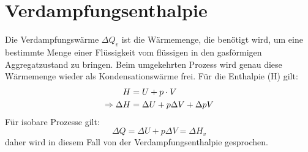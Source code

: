 \documentclass[10pt,a4paper]{article}
\begin{document}
\section{Verdampfungsenthalpie}
Die Verdampfungswärme $\Delta Q_v$ ist die Wärmemenge, die benötigt wird, um eine bestimmte Menge einer Flüssigkeit vom flüssigen in den gasförmigen Aggregatzustand zu bringen.
Beim umgekehrten Prozess wird genau diese Wärmemenge wieder als Kondensationswärme frei.
Für die Enthalpie (H) gilt:
\begin{align}
H &= U + p \cdot V \\
\Rightarrow \Delta H &= \Delta U + p \Delta V + \Delta p V \notag
\end{align}
Für isobare Prozesse gilt: 
\begin{equation}
\Delta Q = \Delta U + p \Delta V = \Delta H_v
\end{equation}
daher wird in diesem Fall von der Verdampfungsenthalpie gesprochen.
\end{document}
